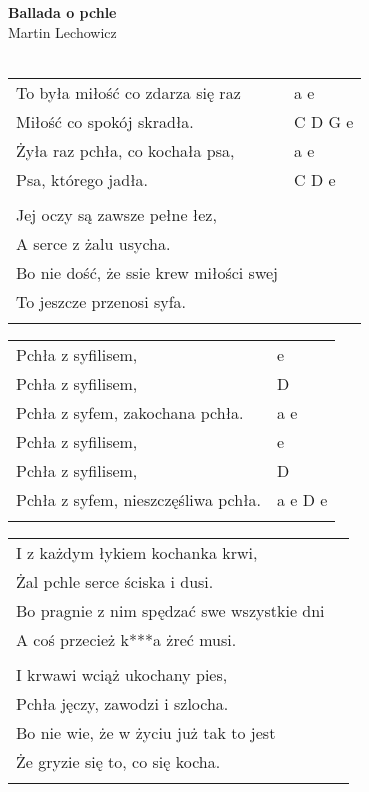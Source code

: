 \documentclass[a5paper]{article}
\begin{document}


\noindent
\fontsize{12pt}{15pt}\selectfont
\textbf{Ballada o pchle} \\
\fontsize{8pt}{10pt}\selectfont
Martin Lechowicz \\ \\
\fontsize{10pt}{12pt}\selectfont
{}
\begin{tabular}{@{}p{8.5cm}p{3cm}@{}}
\noindent
To była miłość co zdarza się raz & a e \\
Miłość co spokój skradła. & C D G e \\
Żyła raz pchła, co kochała psa, & a e \\
Psa, którego jadła. & C D e \\ \\

Jej oczy są zawsze pełne łez, \\
A serce z żalu usycha. \\
Bo nie dość, że ssie krew miłości swej \\
To jeszcze przenosi syfa. \\ \\
\end{tabular}

\noindent
\begin{tabular}{@{}p{7.5cm}p{3cm}@{}}
Pchła z syfilisem, & e \\
Pchła z syfilisem, & D \\
Pchła z syfem, zakochana pchła. & a e \\

Pchła z syfilisem, & e \\
Pchła z syfilisem, & D \\
Pchła z syfem, nieszczęśliwa pchła. & a e D e \\ \\
\end{tabular}

\noindent
\begin{tabular}{@{}p{8.5cm}p{3cm}@{}}
I z każdym łykiem kochanka krwi, \\
Żal pchle serce ściska i dusi. \\
Bo pragnie z nim spędzać swe wszystkie dni \\
A coś przecież k***a żreć musi. \\ \\

I krwawi wciąż ukochany pies, \\
Pchła jęczy, zawodzi i szlocha. \\
Bo nie wie, że w życiu już tak to jest \\
Że gryzie się to, co się kocha. \\ \\
\end{tabular}
\end{document}
